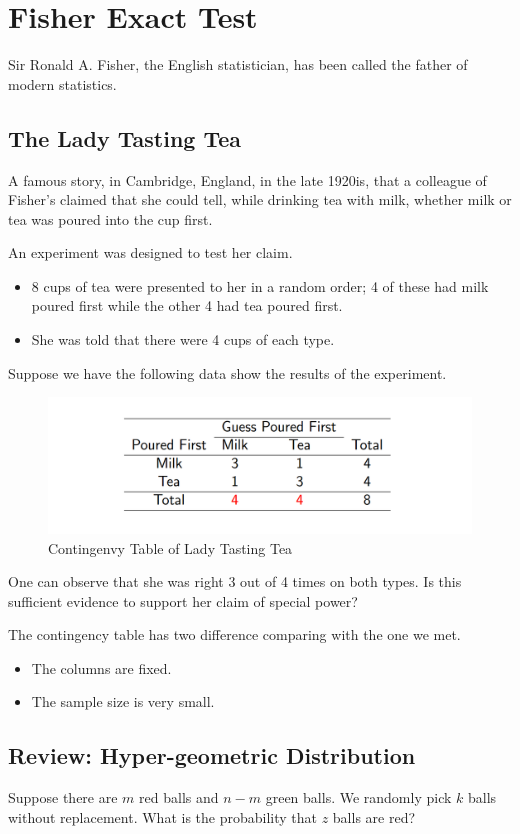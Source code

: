 \section{Fisher Exact Test}
Sir Ronald A. Fisher, the English statistician, has been called the
father of modern statistics.

\subsection{The Lady Tasting Tea}
A famous story, in Cambridge, England, in the late 1920is, that a colleague of Fisher's claimed that she
could tell, while drinking tea with milk, whether milk or tea was
poured into the cup first. 

An experiment was designed to test her claim.
\begin{itemize}
	\item 8 cups of tea were presented to her in a random order; 4 of these
	had milk poured first while the other 4 had tea poured first.
	\item She was told that there were 4 cups of each type.
\end{itemize}

Suppose we have the following data show the results of the experiment. 
\begin{figure}[H]
	\centering
	\includegraphics[width=0.7\linewidth]{fig/screenshot004}
	\caption{Contingenvy Table of Lady Tasting Tea}
	\label{fig:screenshot004}
\end{figure}

One can observe that she was right 3 out of 4 times on both types. Is this sufficient
evidence to support her claim of special power?

The contingency table has two difference comparing with the one we met.
\begin{itemize}
	\item The columns are fixed.
	\item The sample size is very small.
\end{itemize}

\subsection{Review: Hyper-geometric Distribution}
Suppose there are $m$ red balls and $n - m$ green balls. We randomly
pick $k$ balls without replacement. What is the probability that $z$ balls
are red?

